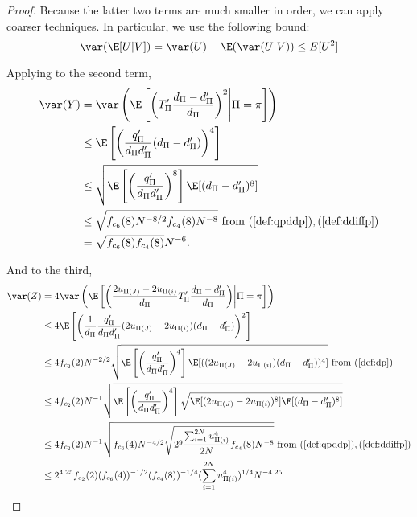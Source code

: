 \begin{proof}
  Because the latter two terms are much smaller in order, we can apply
  coarser techniques.  In particular, we use the following bound:
  \begin{equation*}
    \var (\E[U|V]) = \var(U) - \E (\var (U|V)) \leq E[U^2]
  \end{equation*}

  Applying to the second term,
  \begin{align*}
    \var(Y) &= \var \left ( \E \left [ \left ( T'_{\Pi}\frac{d_{\Pi}-d_{\Pi}'}{d_{\Pi}} \right )^2
        \middle | \Pi = \pi \right ] \right ) \\
    &\leq \E \left [ \left ( \frac{q_{\Pi}'}{d_{\Pi}d_{\Pi}'} (d_{\Pi}-d_{\Pi}') \right )^4 \right ] \\
    &\leq \sqrt{\E \left [ \left ( \frac{q_{\Pi}'}{d_{\Pi}d_{\Pi}'} \right )^8 \right ]
      \E [(d_{\Pi}-d_{\Pi}')^8]} \\
    &\leq \sqrt{f_{c_6}(8) N^{-8/2} f_{c_4}(8) N^{-8}} \text{ from }
    (\ref{def:qpddp}),(\ref{def:ddiffp}) \\
    &= \sqrt{f_{c_6}(8)f_{c_4}(8)}N^{-6}.
  \end{align*}

  And to the third,
  \begin{align*}
    \var(Z) &= 4 \var \left ( \E \left [ \left ( \frac{2u_{\Pi(J)}-2u_{\Pi(i)}}{d_{\Pi}}
          T_{\Pi}'\frac{d_{\Pi}-d_{\Pi}'}{d_{\Pi}} \right ) \middle | \Pi = \pi \right ] \right ) \\
    &\leq 4 \E \left [ \left ( \frac{1}{d_{\Pi}} \frac{q_{\Pi}'}{d_{\Pi}d_{\Pi}'}
        (2u_{\Pi(J)}-2u_{\Pi(i)})(d_{\Pi}-d_{\Pi}') \right )^2 \right ] \\
    &\leq 4 f_{c_2}(2) N^{-2/2} \sqrt{\E \left [ \left (
          \frac{q_{\Pi}'}{d_{\Pi}d_{\Pi}'} \right )^4 \right ] \E[((2u_{\Pi(J)}-2u_{\Pi(i)})(d_{\Pi}-d_{\Pi}'))^4]
    } \text{ from } (\ref{def:dp}) \\
    &\leq 4 f_{c_2}(2) N^{-1} \sqrt{\E \left [ \left (
          \frac{q_{\Pi}'}{d_{\Pi}d_{\Pi}'} \right )^4 \right ] \sqrt{\E[(2u_{\Pi(J)}-2u_{\Pi(i)})^8]
      \E[(d_{\Pi}-d_{\Pi}')^8]}} \\
    &\leq 4 f_{c_2}(2) N^{-1} \sqrt{f_{c_6}(4) N^{-4/2} \sqrt{2^9
        \frac{\sum_{i=1}^{2N}u_{\Pi(i)}^4}{2N} f_{c_4}(8) N^{-8}}}
    \text{ from } (\ref{def:qpddp}),(\ref{def:ddiffp}) \\
    &\leq 2^{4.25}f_{c_2}(2) (f_{c_6}(4))^{-1/2} (f_{c_4}(8))^{-1/4}
    (\sum_{i=1}^{2N}u_{\Pi(i)}^4)^{1/4} N^{-4.25}
  \end{align*}
\end{proof}

